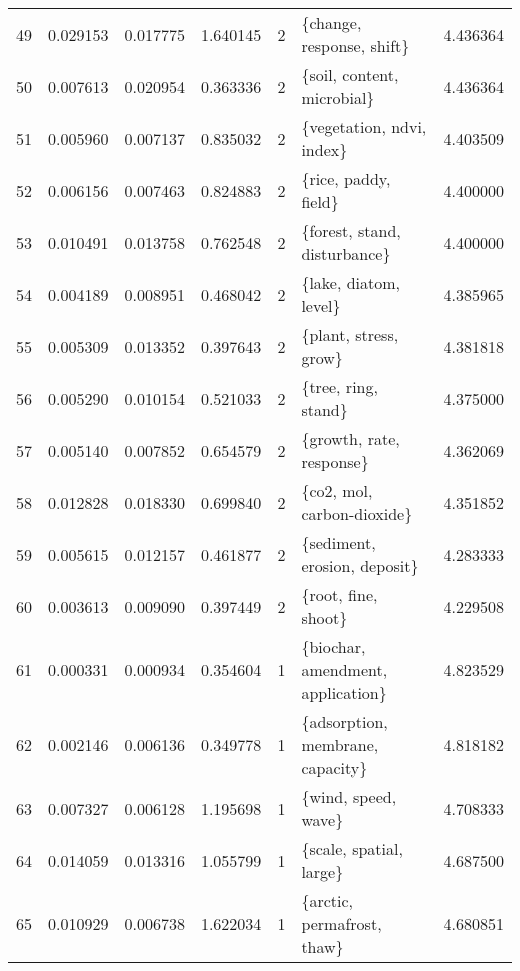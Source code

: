 \begin{tabular}{lrrrrlr}
49 &    0.029153 &  0.017775 &        1.640145 &           2 &               \{change, response, shift\} &  4.436364 \\
50 &    0.007613 &  0.020954 &        0.363336 &           2 &              \{soil, content, microbial\} &  4.436364 \\
51 &    0.005960 &  0.007137 &        0.835032 &           2 &               \{vegetation, ndvi, index\} &  4.403509 \\
52 &    0.006156 &  0.007463 &        0.824883 &           2 &                    \{rice, paddy, field\} &  4.400000 \\
53 &    0.010491 &  0.013758 &        0.762548 &           2 &            \{forest, stand, disturbance\} &  4.400000 \\
54 &    0.004189 &  0.008951 &        0.468042 &           2 &                   \{lake, diatom, level\} &  4.385965 \\
55 &    0.005309 &  0.013352 &        0.397643 &           2 &                   \{plant, stress, grow\} &  4.381818 \\
56 &    0.005290 &  0.010154 &        0.521033 &           2 &                     \{tree, ring, stand\} &  4.375000 \\
57 &    0.005140 &  0.007852 &        0.654579 &           2 &                \{growth, rate, response\} &  4.362069 \\
58 &    0.012828 &  0.018330 &        0.699840 &           2 &              \{co2, mol, carbon-dioxide\} &  4.351852 \\
59 &    0.005615 &  0.012157 &        0.461877 &           2 &            \{sediment, erosion, deposit\} &  4.283333 \\
60 &    0.003613 &  0.009090 &        0.397449 &           2 &                     \{root, fine, shoot\} &  4.229508 \\
61 &    0.000331 &  0.000934 &        0.354604 &           1 &       \{biochar, amendment, application\} &  4.823529 \\
62 &    0.002146 &  0.006136 &        0.349778 &           1 &        \{adsorption, membrane, capacity\} &  4.818182 \\
63 &    0.007327 &  0.006128 &        1.195698 &           1 &                     \{wind, speed, wave\} &  4.708333 \\
64 &    0.014059 &  0.013316 &        1.055799 &           1 &                 \{scale, spatial, large\} &  4.687500 \\
65 &    0.010929 &  0.006738 &        1.622034 &           1 &              \{arctic, permafrost, thaw\} &  4.680851 \\

\end{tabular}
